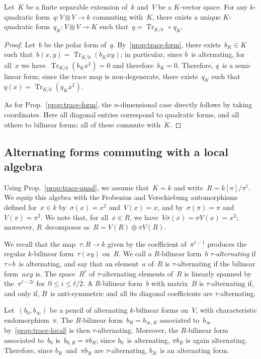 \documentclass{article}%
\DeclareMathOperator\Tr{Tr}
\begin{document}
\begin{prop} \label{prop:trace-quad}%
Let~$K$ be a finite separable extension of~$k$ and~$V$ be a $K$-vector
space. For any $k$-quadratic form~$q: V ⊗ V → k$ commuting with~$K$,
there exists a unique $K$-quadratic form~$q_K: V ⊗ V → K$ such that~$q =
\Tr_{K/k} \, ∘ \, q_K$.
\end{prop}

\begin{proof}
Let~$b$ be the polar form of~$q$. By~\ref{prop:trace-form},
there exists~$b_K ∈ K$
such that~$b(x,y) = \Tr_{K/k} (b_K xy)$; in particular, since $b$~is
alternating, for all~$x$ we have~$\Tr_{K/k} (b_K x^2) = 0$ and
therefore~$b_K = 0$. Therefore, $q$~is a semi-linear form; since the
trace map is non-degenerate, there exists~$q_K$ such that~$q(x) =
\Tr_{K/k} (q_K x^2)$.

As for Prop.~\ref{prop:trace-form}, the $n$-dimensional case directly follows by
taking coordinates. Here all diagonal entries correspond to quadratic
forms, and all others to bilinear forms; all of these commute with~$K$.
\end{proof}%

\subsection{Alternating forms commuting with a local algebra}%
\label{SS:alt-pencil}

Using Prop.~\ref{prop:trace-quad},
we assume that~$K = k$ and write~$R = k[π] / π^ℓ$.
We equip this algebra with the Frobenius and Verschiebung automorphisms
defined for~$x ∈ k$ by~$σ(x) = x^2$ and~$V(x) = x$,
and by~$σ(π) = π$ and~$V(π) = π^2$.
We note that, for all~$x ∈ R$, we have~$V σ(x) = σ V(x) = x^2$;
moreover, $R$~decomposes as~$R = V(R) ⊕ π V(R)$.

We recall that the map~$τ: R → k$ given by the coefficient of~$π^{ℓ-1}$
produces the regular $k$-bilinear form~$τ(x y)$ on~$R$.
We call a $R$-bilinear form~$b$ \emph{$τ$-alternating} if $τ ∘ b$~is
alternating, and say that an element~$a$ of~$R$ is $τ$-alternating if the
bilinear form~$a x y$ is.
The space~$R^{τ}$ of $τ$-alternating elements of~$R$ is linearly spanned
by the~$π^{ℓ-2i}$ for~$0 ≤ i ≤ ℓ/2$.
A $R$-bilinear form~$b$ with matrix~$B$ is $τ$-alternating if, and only if,
$B$~is anti-symmetric and all its diagonal coefficients are $τ$-alternating.

Let~$(b_0, b_{∞})$ be a pencil of alternating $k$-bilinear forms on~$V$,
with characteristic endomorphism~$π$. The $R$-bilinear form~$b_R = b_{∞,
R}$ associated to~$b_{∞}$ by~\ref{prop:trace-local} is then
$τ$-alternating. Moreover, the $R$-bilinear form associated to~$b_{0}$
is~$b_{0, R} = π b_R$; since $b_{0}$~is alternating, $π b_R$ is again
alternating. Therefore, since $b_R$~and~$π b_R$ are $τ$-alternating,
$b_R$~is an alternating form.
\end{document}
